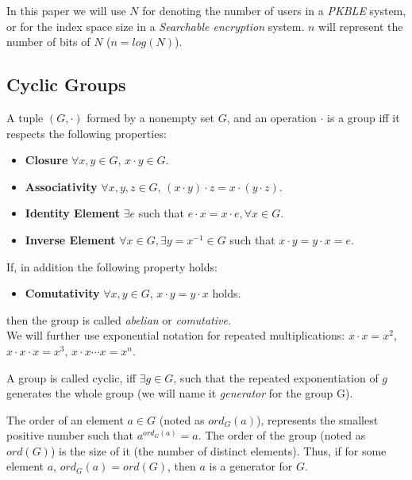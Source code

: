\documentclass[a4paper, 12pt, oneside]{article}
\begin{document}
In this paper we will use $N$ for denoting the number of users in a \textit{PKBLE} system, or for the index space size in a \textit{Searchable encryption} system.
$n$ will represent the number of bits of $N$ ($n = log(N)$).

	

\subsection{Cyclic Groups}

A tuple $(G, \cdot)$ formed by a nonempty set $G$, and an operation $\cdot$ is a group iff it respects the following properties:

\begin{itemize}

\item \textbf{Closure} $\forall x, y \in G$, $x \cdot y \in G$.
\item \textbf{Associativity} $\forall x, y, z \in G$, $(x\cdot y)\cdot z = x\cdot (y\cdot z) $.

\item \textbf{Identity Element} $\exists e$ such that $ e\cdot x = x\cdot e, \forall x \in G$.

\item \textbf{Inverse Element} $\forall x \in G, \exists y = x^{-1} \in G$ such that $ x\cdot y =  y\cdot x = e$.

\end{itemize}

If, in addition the following property holds:

\begin{itemize}

\item \textbf{Comutativity} $\forall x, y \in G$, $x\cdot y = y\cdot x$ holds.

\end{itemize}
 then the group is called \textit{abelian} or \textit{comutative}.\\
 
 We will further use exponential notation for repeated multiplications: 
 $x \cdot x = x^2$, $x \cdot x \cdot x = x^3$, $x \cdot x \cdots x = x^n$.

\bigskip
A group is called cyclic, iff $\exists g \in G$, such that the repeated exponentiation of $g$ generates the whole group (we will name it \textit{generator} for the group G).

\bigskip
The order of an element $a \in G$ (noted as $ord_G(a)$), represents the smallest positive number such that $a^{ord_G(a)} = a$. The order of the group (noted as $ord(G)$) is the size of it (the number of distinct elements). Thus, if for some element $a$, $ord_G(a) = ord(G)$, then $a$ is a generator for $G$.
\end{document}
